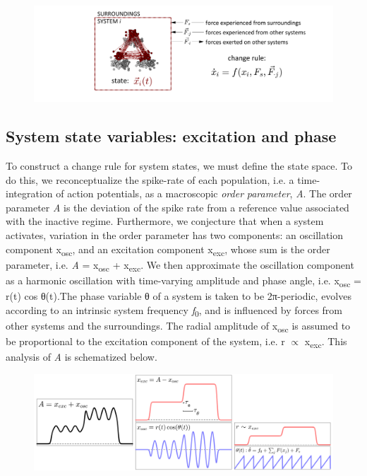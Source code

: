   
\begin{figure}
\includegraphics[width=\textwidth]{figures/Tilsen-img11.png}
\caption{\missingcaption}
\label{fig:}
\end{figure}
 

\subsection{System state variables: excitation and phase}

To construct a change rule for system states, we must define the state space. To do this, we reconceptualize the spike-rate of each population, i.e. a time-integration of action potentials, as a macroscopic \textit{order} \textit{parameter}, \textit{A}. The order parameter \textit{A} is the deviation of the spike rate from a reference value associated with the inactive regime. Furthermore, we conjecture that when a system activates, variation in the order parameter has two components: an oscillation component x\textsubscript{osc}, and an excitation component x\textsubscript{exc}, whose sum is the order parameter, i.e. \textit{A} = x\textsubscript{osc} + x\textsubscript{exc}. We then approximate the oscillation component as a harmonic oscillation with time-varying amplitude and phase angle, i.e. x\textsubscript{osc} = r(t) cos θ(t).The phase variable θ of a system is taken to be 2π{}-periodic, evolves according to an intrinsic system frequency \textit{f}\textsubscript{0}, and is influenced by forces from other systems and the surroundings. The radial amplitude of x\textsubscript{osc} is assumed to be proportional to the excitation component of the system, i.e. r  ${\propto}$ x\textsubscript{exc}. This analysis of \textit{A} is schematized below.  

  
\begin{figure}
\includegraphics[width=\textwidth]{figures/Tilsen-img12.png}
\caption{\missingcaption}
\label{fig:}
\end{figure}
 

